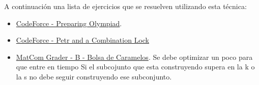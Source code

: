A continuación una lista de ejercicios que se resuelven utilizando esta técnica:

\begin{itemize}
	\item \href{https://codeforces.com/problemset/problem/550/B} {CodeForce - Preparing Olympiad}. 
	\item \href{https://codeforces.com/problemset/problem/1097/B} {CodeForce - Petr and a Combination Lock} 
	\item \href{https://matcomgrader.com/problem/5867/bolsa-de-caramelos/} {MatCom Grader - B - Bolsa de Caramelos}. Se debe optimizar un poco para que entre en tiempo Si el subcojunto que esta construyendo supera en la k o la s no debe seguir construyendo ese subconjunto.
\end{itemize}